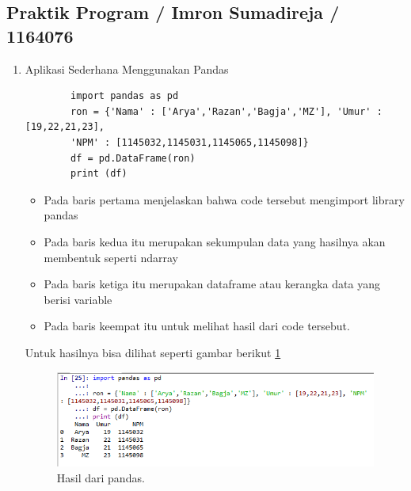 \subsection{Praktik Program / Imron Sumadireja / 1164076}
\begin{enumerate}
\item Aplikasi Sederhana Menggunakan Pandas \par
	\begin{verbatim}
		import pandas as pd
		ron = {'Nama' : ['Arya','Razan','Bagja','MZ'], 'Umur' : [19,22,21,23], 
		'NPM' : [1145032,1145031,1145065,1145098]}
		df = pd.DataFrame(ron)
		print (df)
	\end{verbatim}
\begin{itemize}
\item Pada baris pertama menjelaskan bahwa code tersebut mengimport library pandas
\item Pada baris kedua itu merupakan sekumpulan data yang hasilnya akan membentuk seperti ndarray
\item Pada baris ketiga itu merupakan dataframe atau kerangka data yang berisi variable
\item Pada baris keempat itu untuk melihat hasil dari code tersebut.
\end{itemize}
Untuk hasilnya bisa dilihat seperti gambar berikut \ref{ron1}
		\begin{figure}[ht]
		\centerline{\includegraphics[width=1\textwidth]{figures/im/ron1.png}}
		\caption{Hasil dari pandas.}
		\label{ron1}
		\end{figure}


\end{enumerate}
